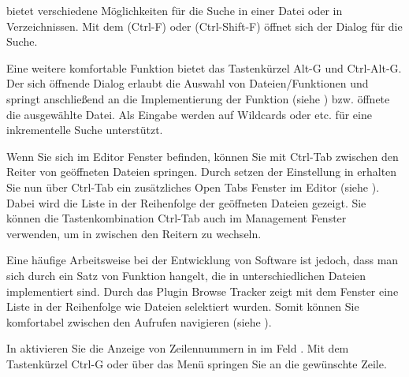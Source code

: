 
\codeblocks bietet verschiedene Möglichkeiten für die Suche in einer Datei oder in Verzeichnissen. Mit dem  (Ctrl-F) oder  (Ctrl-Shift-F) öffnet sich der Dialog für die Suche.

Eine weitere komfortable Funktion bietet das Tastenkürzel Alt-G und Ctrl-Alt-G. Der sich öffnende Dialog erlaubt die Auswahl von Dateien/Funktionen und springt anschließend an die Implementierung der Funktion (siehe ) bzw. öffnete die ausgewählte Datei. Als Eingabe werden auf Wildcards \codeline{*} oder  etc. für eine inkrementelle Suche unterstützt.



Wenn Sie sich im Editor Fenster befinden, können Sie mit Ctrl-Tab zwischen den Reiter von geöffneten Dateien springen. Durch setzen der Einstellung  in  erhalten Sie nun über Ctrl-Tab ein zusätzliches Open Tabs Fenster im Editor (siehe ). Dabei wird die Liste in der Reihenfolge der geöffneten Dateien gezeigt. Sie können die Tastenkombination Ctrl-Tab auch im Management Fenster verwenden, um in zwischen den Reitern zu wechseln.


Eine häufige Arbeitsweise bei der Entwicklung von Software ist jedoch, dass man sich durch ein Satz von Funktion hangelt, die in unterschiedlichen Dateien implementiert sind. Durch das Plugin Browse Tracker zeigt mit dem Fenster  eine Liste in der Reihenfolge wie Dateien selektiert wurden. Somit können Sie komfortabel zwischen den Aufrufen navigieren (siehe ).

In \codeblocks aktivieren Sie die Anzeige von Zeilennummern in  im Feld . Mit dem Tastenkürzel Ctrl-G oder über das Menü  springen Sie an die gewünschte Zeile.


